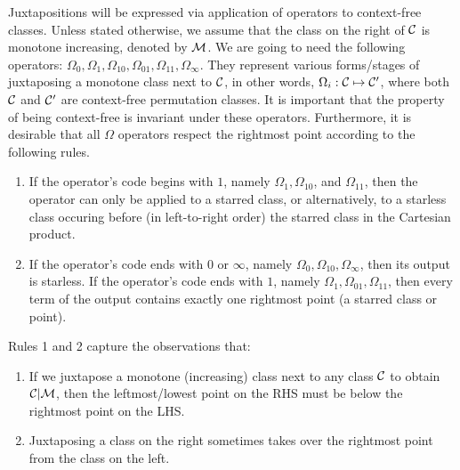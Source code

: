 \documentclass[12pt, a4paper, twoside]{report}
\begin{document}

Juxtapositions will be expressed via application of operators to context-free classes. Unless stated otherwise, we assume that the class on the right of $\mathcal{C}$ is monotone increasing, denoted by $\mathcal{M}$. We are going to need the following operators: $\Omega_0, \Omega_1, \Omega_{10}, \Omega_{01}, \Omega_{11}, \Omega_\infty$. They represent various forms/stages of juxtaposing a monotone class next to $\mathcal{C}$, in other words, $\Omega_i: \mathcal{C} \mapsto \mathcal{C}'$, where both $\mathcal{C}$ and $\mathcal{C}'$ are context-free permutation classes. It is important that the property of being context-free is invariant under these operators. Furthermore, it is desirable that all $\Omega$ operators respect the rightmost point according to the following rules.
\begin{enumerate}
\item If the operator's code begins with $1$, namely $\Omega_1,\Omega_{10}$, and $\Omega_{11}$, then the operator can only be applied to a starred class, or alternatively, to a starless class occuring before (in left-to-right order) the starred class in the Cartesian product.
\item If the operator's code ends with $0$ or $\infty$, namely $\Omega_0, \Omega_{10}, \Omega_\infty$, then its output is starless. If the operator's code ends with $1$, namely $\Omega_1, \Omega_{01}, \Omega_{11}$, then every term of the output contains exactly one rightmost point (a starred class or point).
\end{enumerate}
Rules 1 and 2 capture the observations that:
\begin{enumerate}
\item If we juxtapose a monotone (increasing) class next to any class $\mathcal{C}$ to obtain $\mathcal{C}|\mathcal{M}$, then the leftmost/lowest point on the RHS must be below the rightmost point on the LHS.
\item Juxtaposing a class on the right sometimes takes over the rightmost point from the class on the left.
\end{enumerate}
\end{document}
